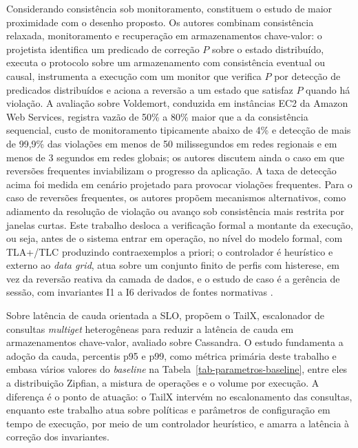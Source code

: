Considerando consistência sob monitoramento, \citet{nguyen_weaker_consistency_2019} constituem o estudo de maior proximidade com o desenho proposto. Os autores combinam consistência relaxada, monitoramento e recuperação em armazenamentos chave-valor: o projetista identifica um predicado de correção $P$ sobre o estado distribuído, executa o protocolo sobre um armazenamento com consistência eventual ou causal, instrumenta a execução com um monitor que verifica $P$ por detecção de predicados distribuídos e aciona a reversão a um estado que satisfaz $P$ quando há violação. A avaliação sobre Voldemort, conduzida em instâncias EC2 da Amazon Web Services, registra vazão de 50\% a 80\% maior que a da consistência sequencial, custo de monitoramento tipicamente abaixo de 4\% e detecção de mais de 99,9\% das violações em menos de 50 milissegundos em redes regionais e em menos de 3 segundos em redes globais; os autores discutem ainda o caso em que reversões frequentes inviabilizam o progresso da aplicação. A taxa de detecção acima foi medida em cenário projetado para provocar violações frequentes. Para o caso de reversões frequentes, os autores propõem mecanismos alternativos, como adiamento da resolução de violação ou avanço sob consistência mais restrita por janelas curtas. Este trabalho desloca a verificação formal a montante da execução, ou seja, antes de o sistema entrar em operação, no nível do modelo formal, com TLA+/TLC produzindo contraexemplos a priori; o controlador é heurístico e externo ao \emph{data grid}, atua sobre um conjunto finito de perfis com histerese, em vez da reversão reativa da camada de dados, e o estudo de caso é a gerência de sessão, com invariantes I1 a I6 derivados de fontes normativas \citep{nist_sp_800_63b4_2025, owasp_session_mgmt_cheatsheet}.

Sobre latência de cauda orientada a SLO, \citet{jaiman_tailx_2020} propõem o TailX, escalonador de consultas \emph{multiget} heterogêneas para reduzir a latência de cauda em armazenamentos chave-valor, avaliado sobre Cassandra. O estudo fundamenta a adoção da cauda, percentis p95 e p99, como métrica primária deste trabalho e embasa vários valores do \emph{baseline} na Tabela~\ref{tab-parametros-baseline}, entre eles a distribuição Zipfian, a mistura de operações e o volume por execução. A diferença é o ponto de atuação: o TailX intervém no escalonamento das consultas, enquanto este trabalho atua sobre políticas e parâmetros de configuração em tempo de execução, por meio de um controlador heurístico, e amarra a latência à correção dos invariantes.

